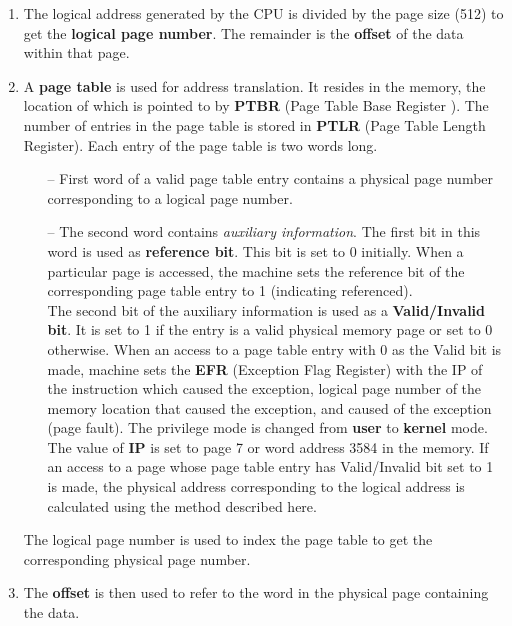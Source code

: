 \documentclass[11pt]{report}
\begin{document}
\begin{enumerate}
\item The logical address generated by the CPU is divided by the page size (512) to get the \textbf{logical page number}. The remainder is the \textbf{offset} of the data within that page.

\item  A \textbf{page table} is used for address translation. It resides in the memory, the location of which is pointed to by \textbf{PTBR} (Page Table Base Register ). The number of entries in the page table is stored in \textbf{PTLR} (Page Table Length Register). Each entry of the page table is two words long.
\begin{itemize}

 \item[--] First word of a valid page table entry contains a physical page number corresponding to a logical page number.
  \item[--] The second word contains \textit{auxiliary information}. The first bit in this word is used as \textbf{reference bit}. This bit is set to 0 initially. When a particular page is accessed, the machine sets the reference bit of the corresponding page table entry to 1 (indicating referenced). \\
    The second bit of the auxiliary information is used as a \textbf{Valid/Invalid bit}. It is set to 1 if the entry is a valid physical memory page or set to 0 otherwise. When an access to a page table entry with 0 as the Valid bit is made, machine sets the \textbf{EFR} (Exception Flag Register) with the IP of the instruction which caused the exception, logical page number of the memory location that caused the exception, and caused of the exception (page fault). The privilege mode is changed from \textbf{user} to \textbf{kernel} mode. The value of \textbf{IP} is set to page 7 or word address 3584 in the memory. If an access to a page whose page table entry has Valid/Invalid bit set to 1 is made, the physical address corresponding to the logical address is calculated using the method described here.
 	
\end{itemize}
The logical page number is used to index the page table to get the corresponding physical page number.

\item The \textbf{offset} is then used to refer to the word in the physical page containing the data.
\end{enumerate} 
\vspace{0.3in}
\end{document}
